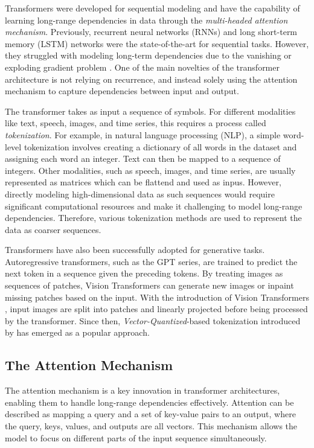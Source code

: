 \documentclass[../../thesis.tex]{subfiles}
\begin{document}
Transformers were developed for sequential modeling and have the capability of learning long-range dependencies in data through the \textit{multi-headed attention mechanism}.  Previously, recurrent neural networks (RNNs) and long short-term memory (LSTM) networks were the state-of-the-art for sequential tasks. However, they struggled with modeling long-term dependencies due to the vanishing or exploding gradient problem \cite{279181}. One of the main novelties of the transformer architecture is not relying on recurrence, and instead solely using the attention mechanism to capture dependencies between input and output.
\newline

The transformer takes as input a sequence of symbols. For different modalities like text, speech, images, and time series, this requires a process called \textit{tokenization}. For example, in natural language processing (NLP), a simple word-level tokenization involves creating a dictionary of all words in the dataset and assigning each word an integer. Text can then be mapped to a sequence of integers. Other modalities, such as speech, images, and time series, are usually represented as matrices which can be flattend and used as inpus. However, directly modeling high-dimensional data as such sequences would require significant computational resources and make it challenging to model long-range dependencies. Therefore, various tokenization methods are used to represent the data as coarser sequences. 
\newline

Transformers have also been successfully adopted for generative tasks. Autoregressive transformers, such as the GPT series, are trained to predict the next token in a sequence given the preceding tokens. By treating images as sequences of patches, Vision Transformers can generate new images or inpaint missing patches based on the input. With the introduction of Vision Transformers \cite{dosovitskiy2021image}, input images are split into patches and linearly projected before being processed by the transformer. Since then, \textit{Vector-Quantized}-based tokenization introduced by \cite{VQVAE} has emerged as a popular approach.

\subsection{The Attention Mechanism}

The attention mechanism is a key innovation in transformer architectures, enabling them to handle long-range dependencies effectively. Attention can be described as mapping a query and a set of key-value pairs to an output, where the query, keys, values, and outputs are all vectors. This mechanism allows the model to focus on different parts of the input sequence simultaneously.
\end{document}
